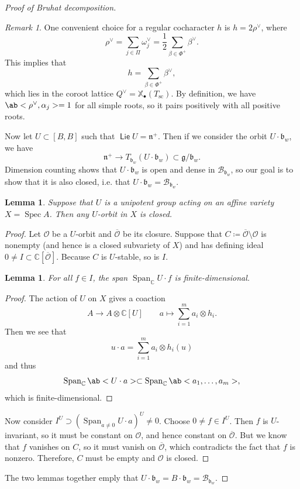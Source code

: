 \documentclass{amsart}
\newtheorem{lem}[thm]{Lemma}
\theoremstyle{definition}
\theoremstyle{remark}
\newtheorem{rmk}[thm]{Remark}
\theoremstyle{plain}
\theoremstyle{definition}
\theoremstyle{remark}
\newcommand{\C}{\mathbb{C}}
\newcommand{\X}{\mathbb{X}}
\newcommand{\g}{\mathfrak{g}}
\newcommand{\n}{\mathfrak{n}}
\renewcommand{\b}{\mathfrak{b}}
\newcommand{\mc}[1]{\mathcal{#1}}
\newcommand{\on}[1]{\operatorname{#1}}
\newcommand{\ms}[1]{\mathsf{#1}}
\newcommand{\ol}[1]{\overline{#1}}
\newcommand{\1}{\mathbf{1}}
\newcommand{\2}{\mathbf{2}}
\newcommand{\3}{\mathbf{3}}
\DeclareMathOperator{\Spec}{Spec}
\begin{document}
\begin{proof}[Proof of Bruhat decomposition]
    \begin{rmk}
    One convenient choice for a regular cocharacter \(h\) is \(h = 2 \rho^{\vee}\), where
    \[ \rho^{\vee} = \sum_{j \in \Pi} \omega_j^{\vee} = \frac{1}{2} \sum_{\beta \in \Phi^+} {\beta}^{\vee}. \]
    This implies that
    \[ h = \sum_{\beta \in \Phi^+} \beta^{\vee}, \]
    which lies in the coroot lattice \(Q^{\vee} = \X_{\bullet}(T_{\on{sc}})\). By definition, we have \(\ab<\rho^{\vee}, \alpha_j> = 1\) for all simple roots, so it pairs positively with all positive roots. 
\end{rmk}

    Now let \(U \subset [B, B]\) such that \(\on{\ms{Lie}} U = \n^+\). Then if we consider the orbit \(U \cdot \b_w\), we have
    \[ \n^+ \to T_{\b_w} (U \cdot \b_w) \subset \g / \b_w. \]
    Dimension counting shows that \(U \cdot \b_w\) is open and dense in \(\mc{B}_{\b_w}\), so our goal is to show that it is also closed, i.e. that \(U \cdot \b_w = \mc{B}_{\b_w}\).

    \begin{lem}
        Suppose that \(U\) is a unipotent group acting on an affine variety \(X = \Spec A\). Then any \(U\)-orbit in \(X\) is closed.
    \end{lem}

    \begin{proof}[Proof]
        Let \(\mc{O}\) be a \(U\)-orbit and \(\ol{\mc{O}}\) be its closure. Suppose that \(C \coloneqq \ol{\mc{O}} \setminus \mc{O}\) is nonempty (and hence is a closed subvariety of \(X\)) and has defining ideal \(0 \neq I \subset \C[\ol{\mc{O}}]\). Because \(C\) is \(U\)-stable, so is \(I\).

        \begin{lem}
            For all \(f \in I\), the span \(\on{Span}_{\C} U \cdot f\) is finite-dimensional.
        \end{lem}

        \begin{proof}
            The action of \(U\) on \(X\) gives a coaction
            \[ A \to A \otimes \C[U] \qquad a \mapsto \sum_{i=1}^m a_i \otimes h_i. \]
            Then we see that
            \[ u \cdot a = \sum_{i=1}^m a_i \otimes h_i(u) \]
            and thus
            \[ \on{Span}_{\C} \ab< U \cdot a> \subset \on{Span}_{\C} \ab<a_1, \ldots, a_m>, \]
            which is finite-dimensional.
        \end{proof}

        Now consider \(I^U \supset (\on{Span}_{a \neq 0} U \cdot a)^U \neq 0\). Choose \(0 \neq f \in I^U\). Then \(f\) is \(U\)-invariant, so it must be constant on \(\mc{O}\), and hence constant on \(\ol{\mc{O}}\). But we know that \(f\) vanishes on \(C\), so it must vanish on \(\ol{\mc{O}}\), which contradicts the fact that \(f\) is nonzero. Therefore, \(C\) must be empty and \(\mc{O}\) is closed.
    \end{proof}

    The two lemmas together emply that \(U \cdot \b_w = B \cdot \b_w = \mc{B}_{\b_w}\).
\end{proof}
\end{document}
